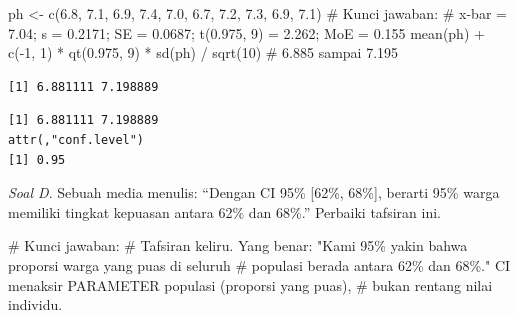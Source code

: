 \documentclass[
  indonesian,
  letterpaper,
]{book}
\newenvironment{Shaded}{\begin{snugshade}}{\end{snugshade}}
\newcommand{\CommentTok}[1]{\textcolor[rgb]{0.37,0.37,0.37}{#1}}
\newcommand{\DecValTok}[1]{\textcolor[rgb]{0.68,0.00,0.00}{#1}}
\newcommand{\FloatTok}[1]{\textcolor[rgb]{0.68,0.00,0.00}{#1}}
\newcommand{\FunctionTok}[1]{\textcolor[rgb]{0.28,0.35,0.67}{#1}}
\newcommand{\NormalTok}[1]{\textcolor[rgb]{0.00,0.23,0.31}{#1}}
\newcommand{\OtherTok}[1]{\textcolor[rgb]{0.00,0.23,0.31}{#1}}
\newcommand{\SpecialCharTok}[1]{\textcolor[rgb]{0.37,0.37,0.37}{#1}}
\begin{document}
\begin{Shaded}
\begin{Highlighting}[]
\NormalTok{ph }\OtherTok{\textless{}{-}} \FunctionTok{c}\NormalTok{(}\FloatTok{6.8}\NormalTok{, }\FloatTok{7.1}\NormalTok{, }\FloatTok{6.9}\NormalTok{, }\FloatTok{7.4}\NormalTok{, }\FloatTok{7.0}\NormalTok{, }\FloatTok{6.7}\NormalTok{, }\FloatTok{7.2}\NormalTok{, }\FloatTok{7.3}\NormalTok{, }\FloatTok{6.9}\NormalTok{, }\FloatTok{7.1}\NormalTok{)}
\CommentTok{\# Kunci jawaban:}
\CommentTok{\# x{-}bar = 7.04; s = 0.2171; SE = 0.0687; t(0.975, 9) = 2.262; MoE = 0.155}
\FunctionTok{mean}\NormalTok{(ph) }\SpecialCharTok{+} \FunctionTok{c}\NormalTok{(}\SpecialCharTok{{-}}\DecValTok{1}\NormalTok{, }\DecValTok{1}\NormalTok{) }\SpecialCharTok{*} \FunctionTok{qt}\NormalTok{(}\FloatTok{0.975}\NormalTok{, }\DecValTok{9}\NormalTok{) }\SpecialCharTok{*} \FunctionTok{sd}\NormalTok{(ph) }\SpecialCharTok{/} \FunctionTok{sqrt}\NormalTok{(}\DecValTok{10}\NormalTok{) }\CommentTok{\# 6.885 sampai 7.195}
\end{Highlighting}
\end{Shaded}

\begin{verbatim}
[1] 6.881111 7.198889
\end{verbatim}

\begin{Shaded}
\end{Shaded}

\begin{verbatim}
[1] 6.881111 7.198889
attr(,"conf.level")
[1] 0.95
\end{verbatim}

\emph{Soal D}. Sebuah media menulis: ``Dengan CI 95\% {[}62\%, 68\%{]},
berarti 95\% warga memiliki tingkat kepuasan antara 62\% dan 68\%.''
Perbaiki tafsiran ini.

\begin{Shaded}
\begin{Highlighting}[]
\CommentTok{\# Kunci jawaban:}
\CommentTok{\# Tafsiran keliru. Yang benar: "Kami 95\% yakin bahwa proporsi warga yang puas di seluruh}
\CommentTok{\# populasi berada antara 62\% dan 68\%." CI menaksir PARAMETER populasi (proporsi yang puas),}
\CommentTok{\# bukan rentang nilai individu.}
\end{Highlighting}
\end{Shaded}
\end{document}

